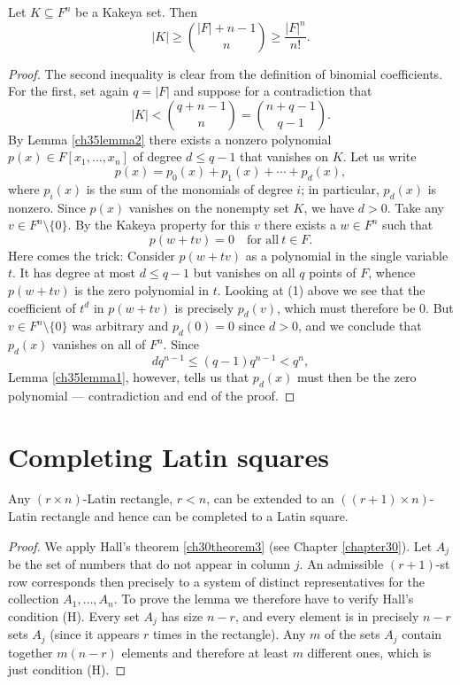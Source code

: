 \begin{theorem}
  \label{kakeya}
  Let $K \subseteq F^n$ be a Kakeya set. Then
\[
|K| \geq \binom{|F| + n - 1}{n} \geq \frac{|F|^n}{n!}.
\]
\end{theorem}
\begin{proof}
  The second inequality is clear from the definition of binomial coefficients. For the first,
  set again $q = |F|$ and suppose for a contradiction that
\[
|K| < \binom{q + n - 1}{n} = \binom{n + q - 1}{q - 1}.
\]
By Lemma \ref{ch35lemma2} there exists a nonzero
polynomial $p(x) \in F[x_1, \dots, x_n]$ of degree $d \leq q - 1$ that
vanishes on $K$. Let us write
\[
p(x) = p_0(x) + p_1(x) + \cdots + p_d(x), \tag{1}
\]
where $p_i(x)$ is the sum of the monomials of degree $i$; in particular, $p_d(x)$ is nonzero.
Since $p(x)$ vanishes on the nonempty set $K$, we have $d > 0$.
Take any $v \in F^n \setminus \{0\}$. By the Kakeya property for this $v$ there
exists a $w \in F^n$ such that
\[
p(w + tv) = 0 \quad \text{for all} \ t \in F.
\]
Here comes the trick: Consider $p(w + tv)$ as a polynomial in the single variable $t$.
It has degree at most $d \leq q - 1$ but vanishes on all $q$ points of $F$,
whence $p(w + tv)$ is the zero polynomial in $t$. Looking at (1) above we see that the
coefficient of $t^d$ in $p(w + tv)$ is precisely $p_d(v)$, which must therefore be 0.
But $v \in F^n \setminus \{0\}$ was arbitrary and $p_d(0) = 0$ since $d > 0$,
and we conclude that $p_d(x)$ vanishes on all of $F^n$. Since
\[
dq^{n-1} \leq (q - 1)q^{n-1} < q^n,
\]
Lemma \ref{ch35lemma1}, however, tells us that $p_d(x)$ must then be the zero polynomial —
contradiction and end of the proof.

\end{proof}


\chapter{Completing Latin squares}

\begin{lemma}
  \label{ch36lemma1}
  Any $(r \times n)$-Latin rectangle, $r < n$, can be extended to an $((r+1) \times n)$-Latin
  rectangle and hence can be completed to a Latin square.
\end{lemma}
\begin{proof}
  We apply Hall's theorem \ref{ch30theorem3} (see Chapter \ref{chapter30}). Let $A_j$ be the set of numbers that do
  not appear in column $j$. An admissible $(r+1)$-st row corresponds then precisely to a system of
  distinct representatives for the collection $A_1, \dots, A_n$. To prove the lemma we
  therefore have to verify Hall's condition (H). Every set $A_j$ has size $n - r$, and every
  element is in precisely $n - r$ sets $A_j$ (since it appears $r$ times in the rectangle).
  Any $m$ of the sets $A_j$ contain together $m(n - r)$ elements and therefore at least $m$
  different ones, which is just condition (H).
\end{proof}

